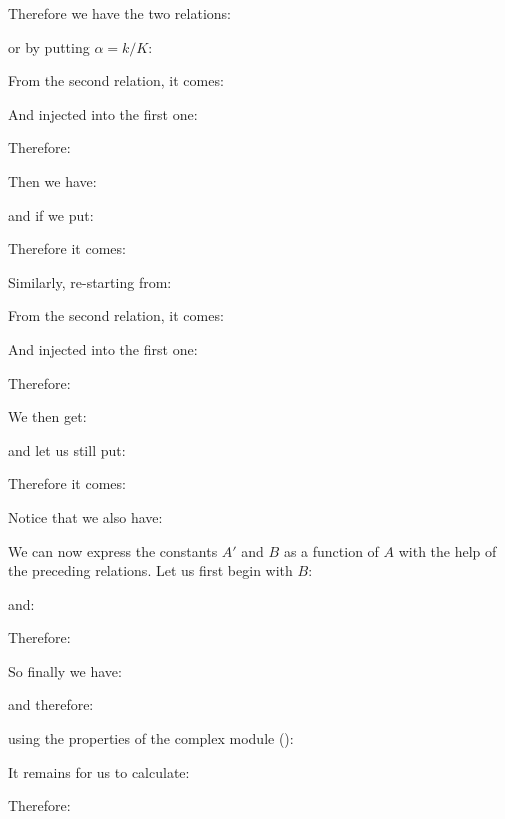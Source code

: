 	\begin{tcolorbox}[colframe=black,colback=white,sharp corners]
	
	Therefore we have the two relations:
	
	or by putting $\alpha=k/K$:
	
	From the second relation, it comes:
	
	And injected into the first one:
	
	Therefore:
	
	Then we have:
	
	and if we put:
	
	Therefore it comes:
	
	Similarly, re-starting from:
	
	From the second relation, it comes:
	\end{tcolorbox}
	
	\begin{tcolorbox}[colframe=black,colback=white,sharp corners]
	
	And injected into the first one:
	
	Therefore:
	
	We then get:
	
	and let us still put:
	
	Therefore it comes:
	
	Notice that we also have:
	
	\end{tcolorbox}
	
	
	\begin{tcolorbox}[colframe=black,colback=white,sharp corners]
	We can now express the constants $A'$ and $B$ as a function of $A$ with the help of the preceding relations. Let us first begin with $B$:
	
	and:
	
	Therefore:
	
	So finally we have:
	
	and therefore:
	\end{tcolorbox}
	
	
	\begin{tcolorbox}[colframe=black,colback=white,sharp corners]
	
	using the properties of the complex module ():
	
	It remains for us to calculate:
	
	Therefore:
	
	\end{tcolorbox}
	
